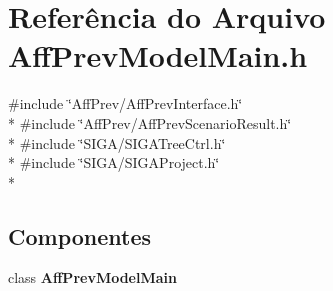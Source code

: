 \section{Referência do Arquivo Aff\+Prev\+Model\+Main.\+h}
\label{_aff_prev_model_main_8h}
{\ttfamily \#include \char`\"{}Aff\+Prev/\+Aff\+Prev\+Interface.\+h\char`\"{}}\\*
{\ttfamily \#include \char`\"{}Aff\+Prev/\+Aff\+Prev\+Scenario\+Result.\+h\char`\"{}}\\*
{\ttfamily \#include \char`\"{}S\+I\+G\+A/\+S\+I\+G\+A\+Tree\+Ctrl.\+h\char`\"{}}\\*
{\ttfamily \#include \char`\"{}S\+I\+G\+A/\+S\+I\+G\+A\+Project.\+h\char`\"{}}\\*
\subsection*{Componentes}
\begin{DoxyCompactItemize}
\item 
class {\bf Aff\+Prev\+Model\+Main}
\end{DoxyCompactItemize}

